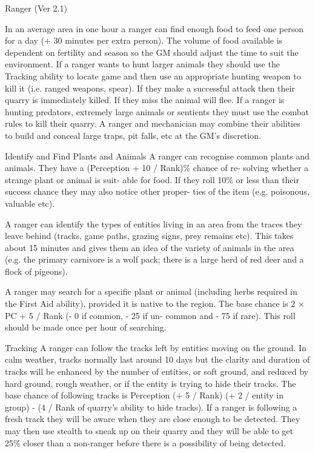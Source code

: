 \begin{Chapter}{Ranger (Ver 2.1)}
\begin{Description}
  In an average area in one hour a ranger can find enough food to feed
  one person for a day (+ 30 minutes per extra person).  The volume of
  food available is dependent on fertility and season so the GM should
  adjust the time to suit the environment.  If a ranger wants to hunt
  larger animals they should use the Tracking ability to locate game
  and then use an appropriate hunting weapon to kill it (i.e.  ranged
  weapons, spear).  If they make a successful attack then their quarry
  is immediately killed.  If they miss the animal will flee.  If a
  ranger is hunting predators, extremely large animals or sentients
  they must use the combat rules to kill their quarry.  A ranger and
  mechanician may combine their abilities to build and conceal large
  traps, pit falls, etc at the GM’s discretion.

\item[Identify and Find Plants and Animals] A ranger can recognise
  common plants and animals.  They have a (Perception + 10 / Rank)\%
  chance of re- solving whether a strange plant or animal is suit-
  able for food.  If they roll 10\% or less than their success chance
  they may also notice other proper- ties of the item (e.g. poisonous,
  valuable etc).

  A ranger can identify the types of entities living in an area from
  the traces they leave behind (tracks, game paths, grazing signs,
  prey remains etc).  This takes about 15 minutes and gives them an
  idea of the variety of animals in the area (e.g. the primary
  carnivore is a wolf pack; there is a large herd of red deer and a
  flock of pigeons).

  A ranger may search for a specific plant or animal (including herbs
  required in the First Aid ability), provided it is native to the
  region. The base chance is 2 × PC + 5 / Rank (- 0 if common, - 25 if
  un- common and - 75 if rare). This roll should be made once per hour
  of searching.

\item[Tracking] A ranger can follow the tracks left by entities moving
  on the ground.  In calm weather, tracks normally last around 10 days
  but the clarity and duration of tracks will be enhanced by the
  number of entities, or soft ground, and reduced by hard ground,
  rough weather, or if the entity is trying to hide their tracks.  The
  base chance of following tracks is Perception (+ 5 / Rank) (+ 2 /
  entity in group) - (4 / Rank of quarry’s ability to hide tracks).
  If a ranger is following a fresh track they will be aware when they
  are close enough to be detected.  They may then use stealth to sneak
  up on their quarry and they will be able to get 25\% closer than a
  non-ranger before there is a possibility of being detected.


\end{Description}
\end{Chapter}
